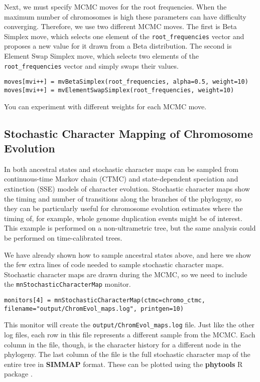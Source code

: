 Next, we must specify MCMC moves for the root frequencies.
When the maximum number of chromosomes is high these parameters
can have difficulty converging.
Therefore, we use two different MCMC moves. The first is Beta Simplex move, which selects one
element of the \texttt{root\_frequencies} vector and proposes
a new value for it drawn from a Beta distribution.
The second is Element Swap Simplex move, which selects two elements
of the \texttt{root\_frequencies} vector and simply swaps their values.
{\tt \begin{snugshade*}
\begin{lstlisting}
moves[mvi++] = mvBetaSimplex(root_frequencies, alpha=0.5, weight=10)
moves[mvi++] = mvElementSwapSimplex(root_frequencies, weight=10)
\end{lstlisting}
\end{snugshade*}}
You can experiment with different weights for each MCMC move.


\medskip
\subsection{Stochastic Character Mapping of Chromosome Evolution}\label{subsect:stoch_mapping}

In \RevBayes both ancestral states and stochastic character maps can be sampled from
continuous-time Markov chain (CTMC) and state-dependent speciation and
extinction (SSE) models of character evolution.
Stochastic character maps show the timing and number of transitions
along the branches of the phylogeny, so they can be particularly useful
for chromosome evolution estimates where the timing of, for example, whole genome duplication events
might be of interest. This example is performed on a non-ultrametric tree, but
the same analysis could be performed on time-calibrated trees.


We have already shown how to sample ancestral states above, and here we show
the few extra lines of \Rev code needed to sample stochastic character maps.
Stochastic character maps are drawn during the MCMC, so we need to include the
\texttt{mnStochasticCharacterMap} monitor.
{\tt \begin{snugshade*}
\begin{lstlisting}
monitors[4] = mnStochasticCharacterMap(ctmc=chromo_ctmc, filename="output/ChromEvol_maps.log", printgen=10)
\end{lstlisting}
\end{snugshade*}}
This monitor will create the \texttt{output/ChromEvol\_maps.log} file.
Just like the other log files, each row in this file represents a different sample from the MCMC.
Each column in the file, though, is the character history for a different node in the phylogeny.
The last column of the file is the full stochastic character map of the entire tree
in \textbf{SIMMAP} \citep{bollback2006simmap} format.
These can be plotted using the \textbf{phytools} R package \citep{revell2012phytools}.


